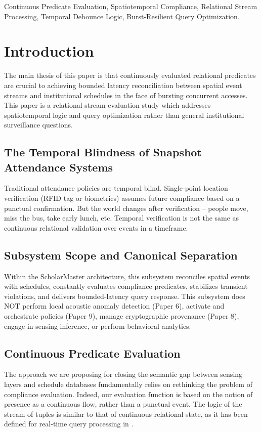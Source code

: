 \documentclass[conference]{IEEEtran}
\begin{document}
\begin{IEEEkeywords}
Continuous Predicate Evaluation, Spatiotemporal Compliance, Relational Stream Processing, Temporal Debounce Logic, Burst-Resilient Query Optimization.
\end{IEEEkeywords}

\section{Introduction}

The main thesis of this paper is that continuously evaluated relational predicates are crucial to achieving bounded latency reconciliation between spatial event streams and institutional schedules in the face of bursting concurrent accesses. This paper is a relational stream-evaluation study which addresses spatiotemporal logic and query optimization rather than general institutional surveillance questions.

\subsection{The Temporal Blindness of Snapshot Attendance Systems}
Traditional attendance policies are temporal blind. Single-point location verification (RFID tag or biometrics) assumes future compliance based on a punctual confirmation. But the world changes after verification – people move, miss the bus, take early lunch, etc. Temporal verification is not the same as continuous relational validation over events in a timeframe.

\subsection{Subsystem Scope and Canonical Separation}
Within the ScholarMaster architecture, this subsystem reconciles spatial events with schedules, constantly evaluates compliance predicates, stabilizes transient violations, and delivers bounded-latency query response. This subsystem does NOT perform local acoustic anomaly detection (Paper 6), activate and orchestrate policies (Paper 9), manage cryptographic provenance (Paper 8), engage in sensing inference, or perform behavioral analytics.

\subsection{Continuous Predicate Evaluation}
The approach we are proposing for closing the semantic gap between sensing layers and schedule databases fundamentally relies on rethinking the problem of compliance evaluation. Indeed, our evaluation function is based on the notion of presence as a continuous flow, rather than a punctual event. The logic of the stream of tuples is similar to that of continuous relational state, as it has been defined for real-time query processing in \cite{b13}.
\end{document}

